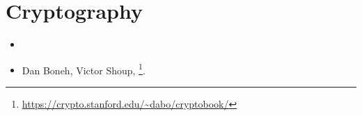 \section{Cryptography}

\begin{itemize}
\item \Schneier{}

\item Dan Boneh, Victor Shoup, \footnote{\AlsoAvailableAs \url{https://crypto.stanford.edu/~dabo/cryptobook/}}.
\end{itemize}

